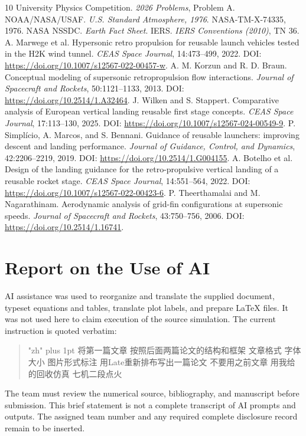 \documentclass[11pt,a4paper]{article}
\begin{document}
\clearpage
{}
{}
\begin{thebibliography}{10}
\small
{} University Physics Competition. \emph{2026 Problems}, Problem A.
 NOAA/NASA/USAF. \emph{U.S. Standard Atmosphere, 1976}. NASA-TM-X-74335, 1976.
 NASA NSSDC. \emph{Earth Fact Sheet}.
 IERS. \emph{IERS Conventions (2010)}, TN 36.
 A. Marwege et al. Hypersonic retro propulsion for reusable launch vehicles tested in the H2K wind tunnel. \emph{CEAS Space Journal}, 14:473--499, 2022. DOI: \url{https://doi.org/10.1007/s12567-022-00457-w}.
 A. M. Korzun and R. D. Braun. Conceptual modeling of supersonic retropropulsion flow interactions. \emph{Journal of Spacecraft and Rockets}, 50:1121--1133, 2013. DOI: \url{https://doi.org/10.2514/1.A32464}.
 J. Wilken and S. Stappert. Comparative analysis of European vertical landing reusable first stage concepts. \emph{CEAS Space Journal}, 17:113--130, 2025. DOI: \url{https://doi.org/10.1007/s12567-024-00549-9}.
 P. Simpl\'{i}cio, A. Marcos, and S. Bennani. Guidance of reusable launchers: improving descent and landing performance. \emph{Journal of Guidance, Control, and Dynamics}, 42:2206--2219, 2019. DOI: \url{https://doi.org/10.2514/1.G004155}.
 A. Botelho et al. Design of the landing guidance for the retro-propulsive vertical landing of a reusable rocket stage. \emph{CEAS Space Journal}, 14:551--564, 2022. DOI: \url{https://doi.org/10.1007/s12567-022-00423-6}.
 P. Theerthamalai and M. Nagarathinam. Aerodynamic analysis of grid-fin configurations at supersonic speeds. \emph{Journal of Spacecraft and Rockets}, 43:750--756, 2006. DOI: \url{https://doi.org/10.2514/1.16741}.
\end{thebibliography}

\clearpage
\section*{Report on the Use of AI}
AI assistance was used to reorganize and translate the supplied document, typeset equations and tables, translate plot labels, and prepare LaTeX files. It was not used here to claim execution of the source simulation. The current instruction is quoted verbatim:
\begin{quote}
{\zhfont\small\XeTeXlinebreaklocale "zh"\XeTeXlinebreakskip=0pt plus 1pt
将第一篇文章 按照后面两篇论文的结构和框架 文章格式 字体大小 图片形式标注 用Late重新排布写出一篇论文 不要用之前文章 用我给的回收仿真 七机二段点火}
\end{quote}
The team must review the numerical source, bibliography, and manuscript before submission. This brief statement is not a complete transcript of AI prompts and outputs. The assigned team number and any required complete disclosure record remain to be inserted.
\end{document}
